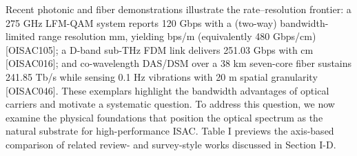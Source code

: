 {}Recent photonic and fiber demonstrations illustrate the rate–resolution frontier: a 275 GHz LFM-QAM system reports 120 Gbps with a (two-way) bandwidth-limited range resolution  mm, yielding  bps/m (equivalently 480 Gbps/cm) [O\markdownRendererUnderscore{}ISAC\markdownRendererUnderscore{}105]; a D-band sub-THz FDM link delivers 251.03 Gbps with  cm [O\markdownRendererUnderscore{}ISAC\markdownRendererUnderscore{}016]; and co-wavelength DAS/DSM over a 38 km seven-core fiber sustains 241.85 Tb/s while sensing 0.1 Hz vibrations with 20 m spatial granularity [O\markdownRendererUnderscore{}ISAC\markdownRendererUnderscore{}046]. These exemplars highlight the bandwidth advantages of optical carriers and motivate a systematic question.\markdownRendererParagraphSeparator
{} To address this question, we now examine the physical foundations that position the optical spectrum as the natural substrate for high-performance ISAC.\markdownRendererParagraphSeparator
{}Table I previews the axis-based comparison of related review- and survey-style works discussed in Section I-D.\markdownRendererParagraphSeparator
{}\markdownRendererInterblockSeparator
